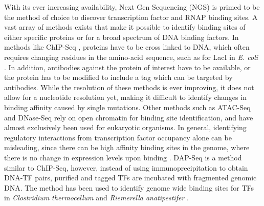 With its ever increasing availability, Next Gen Sequencing (NGS) is primed to be the method of choice to discover transcription factor and RNAP binding sites. A vast array of methods exists that make it possible to identify binding sites of either specific proteins or for a broad spectrum of DNA binding factors. In methods like ChIP-Seq \cite{rhee2012chip}, proteins have to be cross linked to DNA, which often requires changing residues in the amino-acid sequence, such as for LacI in \textit{E. coli} \cite{rutkauskas2009tetramer}. In addition, antibodies against the protein of interest have to be available, or the protein has to be modified to include a tag which can be targeted by antibodies. While the resolution of these methods is ever improving, it does not allow for a nucleotide resolution yet, making it difficult to identify changes in binding affinity caused by single mutations. Other methods such as ATAC-Seq \cite{buenrostro2015atac, li2019identification} and DNase-Seq \cite{boyle2008high} rely on open chromatin for binding site identification, and have almost exclusively been used for eukaryotic organisms. In general, identifying regulatory interactions from transcription factor occupancy alone can be misleading, since there can be high affinity binding sites in the genome, where there is no change in expression levels upon binding \cite{yona2018random}. DAP-Seq \cite{bartlett2017mapping} is a method similar to ChIP-Seq, however, instead of using immunoprecipitation to obtain DNA-TF pairs, purified and tagged TFs are incubated with fragmented genomic DNA. The method has been used to identify genome wide binding sites for TFs in \textit{Clostridium thermocellum} \cite{hebdon2021genome} and \textit{Riemerella anatipestifer} \cite{zhang2022genome}.

